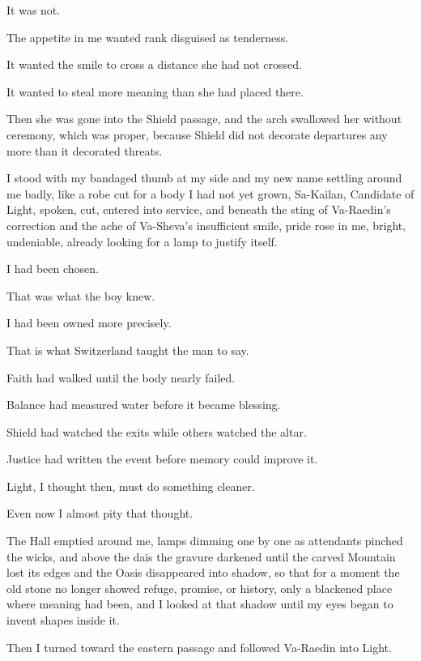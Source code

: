 It was not.\par

The appetite in me wanted rank disguised as tenderness.\par

It wanted the smile to cross a distance she had not crossed.\par

It wanted to steal more meaning than she had placed there.\par

Then she was gone into the Shield passage, and the arch swallowed her without ceremony, which was proper, because Shield did not decorate departures any more than it decorated threats.\par

I stood with my bandaged thumb at my side and my new name settling around me badly, like a robe cut for a body I had not yet grown, Sa-Kailan, Candidate of Light, spoken, cut, entered into service, and beneath the sting of Va-Raedin’s correction and the ache of Va-Sheva’s insufficient smile, pride rose in me, bright, undeniable, already looking for a lamp to justify itself.\par

I had been chosen.\par

That was what the boy knew.\par

I had been owned more precisely.\par

That is what Switzerland taught the man to say.\par

Faith had walked until the body nearly failed.\par

Balance had measured water before it became blessing.\par

Shield had watched the exits while others watched the altar.\par

Justice had written the event before memory could improve it.\par

Light, I thought then, must do something cleaner.\par

Even now I almost pity that thought.\par

The Hall emptied around me, lamps dimming one by one as attendants pinched the wicks, and above the dais the gravure darkened until the carved Mountain lost its edges and the Oasis disappeared into shadow, so that for a moment the old stone no longer showed refuge, promise, or history, only a blackened place where meaning had been, and I looked at that shadow until my eyes began to invent shapes inside it.\par

Then I turned toward the eastern passage and followed Va-Raedin into Light.\par

\ornament


\ornament
